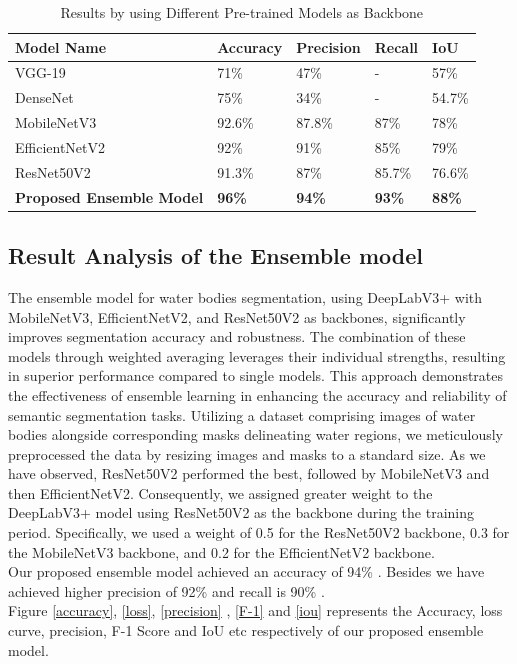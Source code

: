 \begin{table}[htbp]
\centering
\captionsetup{font=small} %
\caption{Results by using Different Pre-trained Models as Backbone}
\label{tab:pretrained-models}
\normalsize %
\begin{tabular}{|p{3.6cm}|p{2cm}|p{2cm}|p{2cm}|p{2cm}|} %
\hline
\textbf{Model Name} & \textbf{Accuracy} & \textbf{Precision} & \textbf{Recall} & \textbf{IoU}\\ 
\hline
VGG-19 & 71\% & 47\% & - & 57\% \\
\hline
DenseNet & 75\% & 34\% & - & 54.7\% \\
\hline
MobileNetV3 & 92.6\% & 87.8\% & 87\% & 78\% \\ 
\hline
EfficientNetV2 & 92\% & 91\% & 85\% & 79\% \\
\hline
ResNet50V2 & 91.3\% & 87\% & 85.7\% & 76.6\% \\
\hline
\textbf{Proposed Ensemble Model } & \textbf{96\%} & \textbf{94\%} & \textbf{93\%} & \textbf{88\%} \\
\hline
\end{tabular}
\end{table}





\pagebreak

\subsection{Result Analysis of the Ensemble model }


The ensemble model for water bodies segmentation, using DeepLabV3+ with MobileNetV3, EfficientNetV2, and ResNet50V2 as backbones, significantly improves segmentation accuracy and robustness. The combination of these models through weighted averaging leverages their individual strengths, resulting in superior performance compared to single models. This approach demonstrates the effectiveness of ensemble learning in enhancing the accuracy and reliability of semantic segmentation tasks. Utilizing a dataset comprising images of water bodies alongside corresponding masks delineating water regions, we meticulously preprocessed the data by resizing images and masks to a standard size.
As we have observed, ResNet50V2 performed the best, followed by MobileNetV3 and then EfficientNetV2. Consequently, we assigned greater weight to the DeepLabV3+ model using ResNet50V2 as the backbone during the training period. Specifically, we used a weight of 0.5 for the ResNet50V2 backbone, 0.3 for the MobileNetV3 backbone, and 0.2 for the EfficientNetV2 backbone. \\                Our proposed ensemble model achieved an accuracy of 94\% . Besides we have achieved higher precision of 92\% and recall is 90\% . \\
Figure
\ref{accuracy}, \ref{loss}, \ref{precision} , \ref{F-1} and \ref{iou} represents the Accuracy, loss curve, precision, F-1 Score and IoU etc
respectively of our proposed ensemble model.
\\


